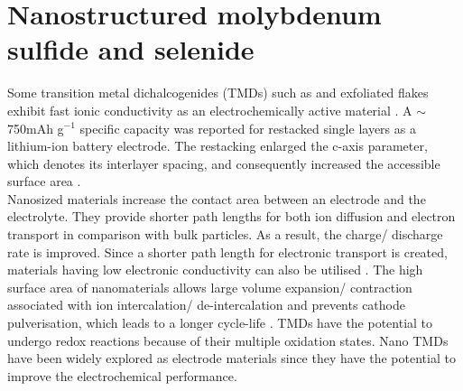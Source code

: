 \section{Nanostructured molybdenum sulfide and selenide}
Some transition metal dichalcogenides (TMDs) such as  and exfoliated  flakes exhibit fast ionic conductivity as an electrochemically active material \cite{du_superior_2010,whittingham_electrical_1976}. A $\sim$750mAh g$^{-1}$ specific capacity was reported for restacked  single layers as a lithium-ion battery electrode. The restacking enlarged the c-axis parameter, which denotes its interlayer spacing, and consequently increased the accessible surface area \cite{ammundsen_novel_2001}.\\
Nanosized materials increase the contact area between an electrode and the electrolyte. They provide shorter path lengths for both ion diffusion and electron transport in comparison with bulk particles. As a result, the charge/ discharge rate is improved. Since a shorter path length for electronic transport is created, materials having low electronic conductivity can also be utilised \cite{pitchai_nanostructured_2011}. The high surface area of nanomaterials allows large volume expansion/ contraction associated with ion intercalation/ de-intercalation and prevents cathode pulverisation, which leads to a longer cycle-life \cite{zhang_ultrathin_2015, cong_intrinsic_2015}. TMDs have the potential to undergo redox reactions because of their multiple oxidation states. Nano TMDs have been widely explored as electrode materials since they have the potential to improve the electrochemical performance. 
